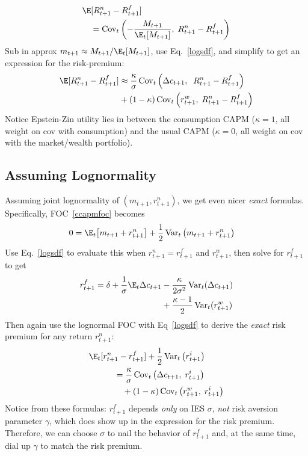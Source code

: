 \documentclass[12pt]{article}
\theoremstyle{plain}
\theoremstyle{definition}
\theoremstyle{remark}
\newcommand{\Cov}{\operatorname{Cov}}
\newcommand{\Var}{\operatorname{Var}}
\begin{document}
\begin{multicols*}{2}
\begin{align*}
  &\E[R_{t+1}^n-R_{t+1}^f]
  \\
  &\quad
  =
  \Cov_t\left(
  -\frac{M_{t+1}}{\E_t[M_{t+1}]},
  \;R_{t+1}^n-R_{t+1}^f
  \right)
\end{align*}
Sub in approx $m_{t+1}\approx M_{t+1}/\E_t[M_{t+1}]$, use
Eq.~\ref{logsdf}, and simplify to get an expression for the
risk-premium:
\begin{align*}
  \E[R_{t+1}^n-R_{t+1}^f]
  &\approx
  \frac{\kappa}{\sigma}\Cov_t\left(
  \Delta c_{t+1},\;
  \;R_{t+1}^n-R_{t+1}^f
  \right)
  \\
  &
  +(1-\kappa)
  \Cov_t\left(
  r_{t+1}^w,
  \;R_{t+1}^n-R_{t+1}^f
  \right)
\end{align*}
Notice Epstein-Zin utility lies in between the consumption CAPM
($\kappa=1$, all weight on cov with consumption) and the usual
CAPM ($\kappa=0$, all weight on cov with the market/wealth portfolio).



\subsection{Assuming Lognormality}

Assuming joint lognormality of $(m_{t+1},r_{t+1}^n)$, we get even nicer
\emph{exact} formulas.  Specifically, FOC~\ref{ccapmfoc} becomes
\begin{align}
  0 &=
  \E_t\big[m_{t+1}+r_{t+1}^n\big]
  +
  \frac{1}{2}\Var_t\big(
  m_{t+1}+r_{t+1}^n\big)
  \notag
\end{align}
Use Eq.~\ref{logsdf} to evaluate this when $r^n_{t+1}=r^f_{t+1}$ and
$r^w_{t+1}$, then solve for $r^f_{t+1}$ to get
\begin{align*}
  r_{t+1}^f
  =
  \delta
  +\frac{1}{\sigma}\E_t\Delta c_{t+1}
  &-
  \frac{\kappa}{2\sigma^2}
  \Var_t(\Delta c_{t+1})
  \\
  &
  +
  \frac{\kappa-1}{2}
  \Var_t(r_{t+1}^w)
\end{align*}
Then again use the lognormal FOC with Eq~\ref{logsdf} to derive the
\emph{exact} risk premium for any return $r_{t+1}^n$:
\begin{align*}
  &\E_t[r_{t+1}^n - r^f_{t+1}]
  +\frac{1}{2}
  \Var_t\big(r_{t+1}^i\big)
  \\
  &
  \qquad\quad
  =
  \frac{\kappa}{\sigma}
  \Cov_t\left(\Delta c_{t+1},\; r_{t+1}^i\right)
  \\
  &
  \qquad\quad\quad
  +(1-\kappa)\Cov_t\left( r_{t+1}^w,\; r_{t+1}^i\right)
\end{align*}
Notice from these formulas: $r^f_{t+1}$ depends \emph{only} on IES
$\sigma$, \emph{not} risk aversion parameter $\gamma$, which does show
up in the expression for the risk premium. Therefore, we can choose
$\sigma$ to nail the behavior of $r^f_{t+1}$ and, at the same time, dial
up $\gamma$ to match the risk premium.




\end{multicols*}
\end{document}

